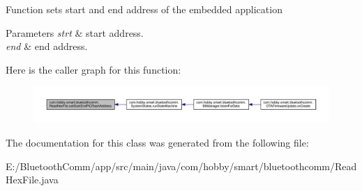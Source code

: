 Function sets start and end address of the embedded application 
\begin{DoxyParams}{Parameters}
{\em strt} & start address. \\
\hline
{\em end} & end address. \\
\hline
\end{DoxyParams}
Here is the caller graph for this function\+:\nopagebreak
\begin{figure}[H]
\begin{center}
\leavevmode
\includegraphics[width=350pt]{classcom_1_1hobby_1_1smart_1_1bluetoothcomm_1_1_read_hex_file_a9c15e4c86ee8bab1c493cc91f42ce1fc_icgraph}
\end{center}
\end{figure}


The documentation for this class was generated from the following file\+:\begin{DoxyCompactItemize}
\item 
E\+:/\+Bluetooth\+Comm/app/src/main/java/com/hobby/smart/bluetoothcomm/Read\+Hex\+File.\+java\end{DoxyCompactItemize}
